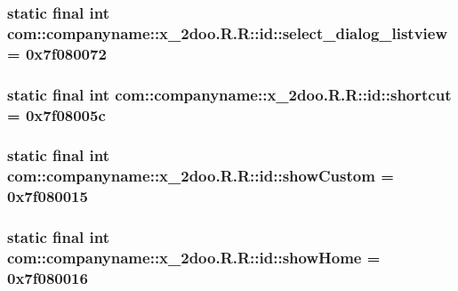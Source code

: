 \hypertarget{classcom_1_1companyname_1_1x__2doo_1_1_r_1_1id_e36e72ede972842dfe6a51347c464fb0}{
\subsubsection[{select\_\-dialog\_\-listview}]{\setlength{\rightskip}{0pt plus 5cm}static final int com::companyname::x\_\-2doo.R.R::id::select\_\-dialog\_\-listview = 0x7f080072}}
\label{classcom_1_1companyname_1_1x__2doo_1_1_r_1_1id_e36e72ede972842dfe6a51347c464fb0}


\hypertarget{classcom_1_1companyname_1_1x__2doo_1_1_r_1_1id_7a7947fce11ad2e6c8c75b762df81a44}{
\subsubsection[{shortcut}]{\setlength{\rightskip}{0pt plus 5cm}static final int com::companyname::x\_\-2doo.R.R::id::shortcut = 0x7f08005c}}
\label{classcom_1_1companyname_1_1x__2doo_1_1_r_1_1id_7a7947fce11ad2e6c8c75b762df81a44}


\hypertarget{classcom_1_1companyname_1_1x__2doo_1_1_r_1_1id_40ea65c053e788a8f03f0c6b594aa4c6}{
\subsubsection[{showCustom}]{\setlength{\rightskip}{0pt plus 5cm}static final int com::companyname::x\_\-2doo.R.R::id::showCustom = 0x7f080015}}
\label{classcom_1_1companyname_1_1x__2doo_1_1_r_1_1id_40ea65c053e788a8f03f0c6b594aa4c6}


\hypertarget{classcom_1_1companyname_1_1x__2doo_1_1_r_1_1id_9fd780a12b974a557adc86815276fbff}{
\subsubsection[{showHome}]{\setlength{\rightskip}{0pt plus 5cm}static final int com::companyname::x\_\-2doo.R.R::id::showHome = 0x7f080016}}
\label{classcom_1_1companyname_1_1x__2doo_1_1_r_1_1id_9fd780a12b974a557adc86815276fbff}


